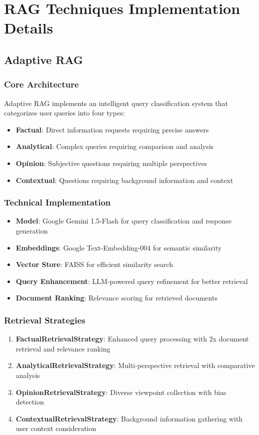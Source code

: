 \documentclass[12pt,a4paper]{article}
\begin{document}
\section{RAG Techniques Implementation Details}

\subsection{Adaptive RAG}

\subsubsection{Core Architecture}
Adaptive RAG implements an intelligent query classification system that categorizes user queries into four types:
\begin{itemize}
    \item \textbf{Factual}: Direct information requests requiring precise answers
    \item \textbf{Analytical}: Complex queries requiring comparison and analysis
    \item \textbf{Opinion}: Subjective questions requiring multiple perspectives
    \item \textbf{Contextual}: Questions requiring background information and context
\end{itemize}

\subsubsection{Technical Implementation}
\begin{itemize}
    \item \textbf{Model}: Google Gemini 1.5-Flash for query classification and response generation
    \item \textbf{Embeddings}: Google Text-Embedding-004 for semantic similarity
    \item \textbf{Vector Store}: FAISS for efficient similarity search
    \item \textbf{Query Enhancement}: LLM-powered query refinement for better retrieval
    \item \textbf{Document Ranking}: Relevance scoring for retrieved documents
\end{itemize}

\subsubsection{Retrieval Strategies}
\begin{enumerate}
    \item \textbf{FactualRetrievalStrategy}: Enhanced query processing with 2x document retrieval and relevance ranking
    \item \textbf{AnalyticalRetrievalStrategy}: Multi-perspective retrieval with comparative analysis
    \item \textbf{OpinionRetrievalStrategy}: Diverse viewpoint collection with bias detection
    \item \textbf{ContextualRetrievalStrategy}: Background information gathering with user context consideration
\end{enumerate}
\end{document}
